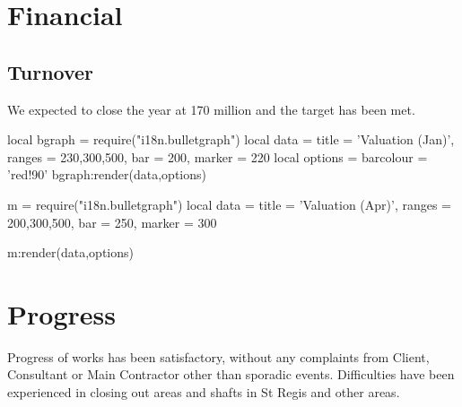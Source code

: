 \documentclass[border=5mm,twocolumn]{report}
\makeatletter
\newenvironment {bulletgraph} {\luacode@begin\luacode@table@soft} {}
\providecommand{\bulletgauge}[4][]{
    \begin{tikzpicture}[scale=0.8, font=\arial]
    \begin{axis}[
       width=8cm,
       chartheight = 60pt,
       xtick pos=left, 
       xtick = {0,50,...,400, 450},
       ytick=\empty,
       xmin=50, xmax=450,
        tick align=outside,
        axis on top,
        every axis title/.style={
            at={(rel axis cs:0,0.5)},
            anchor=east,
            align=right,
            xshift=-0.5em
        },
        #1
    ]
    \pgfplotsinvokeforeach{#4}{
        \pgfplotsset{cycle list name=bullet}
        \addplot +[xbar, bar width=7ex ] coordinates {(##1,0)};
    }
    \addplot [fill= barcolour, xbar, barwidth ] coordinates {(#2,0)};    
    \addplot [mark=|, mark options={very thick}, mark size=2ex, ] coordinates {(#3,0)}; 
    \end{axis}
    \end{tikzpicture}
}
\makeatother
\begin{document}
\arial

\section{Financial}
\subsection{Turnover}

We expected to close the year at 170 million and the target has been met. 

\parindent0pt
 
\begin{bulletgraph}
local  bgraph = require("i18n.bulletgraph")
 local data = {
     title = 'Valuation (Jan)',
     ranges = {230,300,500},
     bar = 200,
     marker = 220}
     local options = {
        barcolour = 'red!90'
   } 
  bgraph:render(data,options)        
\end{bulletgraph}



\medskip

\begin{bulletgraph}
   m = require("i18n.bulletgraph")
   local data = {
      title = 'Valuation (Apr)',
      ranges = {200,300,500},
      bar = 250,
      marker = 300}
   
   m:render(data,options)           
\end{bulletgraph}




\medskip


\medskip


\section{Progress}

Progress of works has been satisfactory, without any complaints from Client, Consultant or Main Contractor other than sporadic events. Difficulties have been experienced in closing out areas and shafts in St Regis and other areas.
\end{document}
